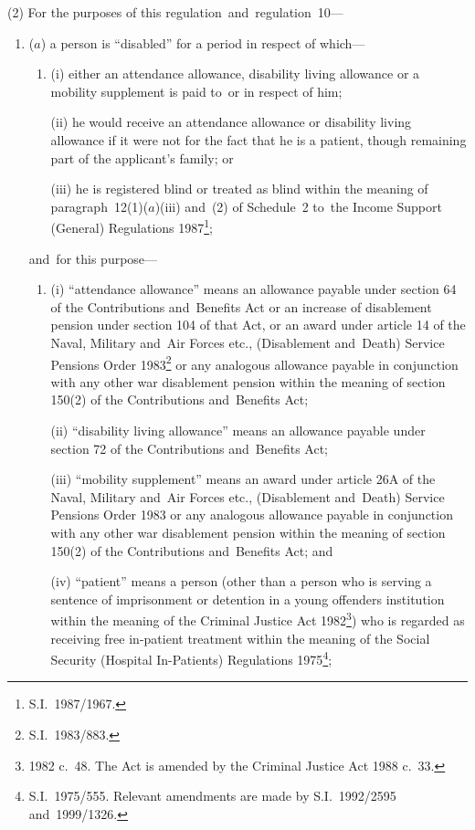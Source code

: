\documentclass[12pt,a4paper]{article}
\begin{document}
(2) For the purposes of this regulation~and~regulation~10—
\begin{enumerate}\item[]
($a$) a person is “disabled” for a period in respect of which—
\begin{enumerate}\item[]
(i) either an attendance allowance, disability living allowance or a mobility supplement is paid to~or in respect of him;

(ii) he would receive an attendance allowance or disability living allowance if it were not for the fact that he is a patient, though remaining part of the applicant’s family; or

(iii) he is registered blind or treated as blind within the meaning of paragraph~12(1)($a$)(iii)  and~(2) of Schedule~2 to~the Income Support (General) Regulations 1987\footnote{S.I.\ 1987/1967.};
\end{enumerate}
and~for this purpose—
\begin{enumerate}\item[]
(i) “attendance allowance” means an allowance payable under section 64 of the Contributions and~Benefits Act or an increase of disablement pension under section 104 of that Act, or an award under article 14 of the Naval, Military and~Air Forces etc., (Disablement and~Death) Service Pensions Order 1983\footnote{S.I.\ 1983/883.} or any analogous allowance payable in conjunction with any other war disablement pension within the meaning of section 150(2) of the Contributions and~Benefits Act;

(ii) “disability living allowance” means an allowance payable under section 72 of the Contributions and~Benefits Act;

(iii) “mobility supplement” means an award under article 26A of the Naval, Military and~Air Forces etc., (Disablement and~Death) Service Pensions Order 1983 or any analogous allowance payable in conjunction with any other war disablement pension within the meaning of section 150(2) of the Contributions and~Benefits Act; and

(iv) “patient” means a person (other than a person who is serving a sentence of imprisonment or detention in a young offenders institution within the meaning of the Criminal Justice Act 1982\footnote{1982 c.\ 48. The Act is amended by the Criminal Justice Act 1988 c.\ 33.}) who is regarded as receiving free in-patient treatment within the meaning of the Social Security (Hospital In-Patients) Regulations 1975\footnote{S.I.\ 1975/555. Relevant amendments are made by S.I.\ 1992/2595 and~1999/1326.};
\end{enumerate}


\end{enumerate}
\end{document}
